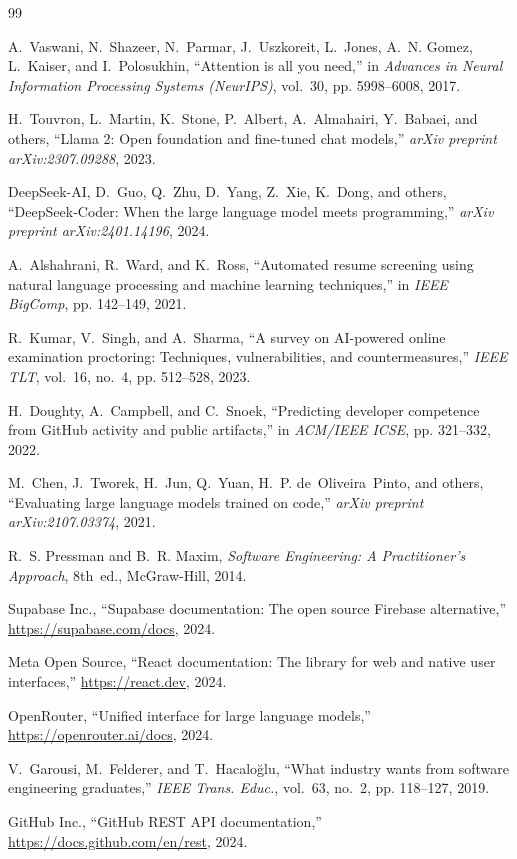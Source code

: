 \documentclass[12pt,a4paper]{report}
\begin{document}
\begin{thebibliography}{99}

A.~Vaswani, N.~Shazeer, N.~Parmar, J.~Uszkoreit, L.~Jones, A.~N. Gomez, L.~Kaiser, and I.~Polosukhin, ``Attention is all you need,'' in \textit{Advances in Neural Information Processing Systems (NeurIPS)}, vol.~30, pp. 5998--6008, 2017.

H.~Touvron, L.~Martin, K.~Stone, P.~Albert, A.~Almahairi, Y.~Babaei, and others, ``Llama 2: Open foundation and fine-tuned chat models,'' \textit{arXiv preprint arXiv:2307.09288}, 2023.

DeepSeek-AI, D.~Guo, Q.~Zhu, D.~Yang, Z.~Xie, K.~Dong, and others, ``DeepSeek-Coder: When the large language model meets programming,'' \textit{arXiv preprint arXiv:2401.14196}, 2024.

A.~Alshahrani, R.~Ward, and K.~Ross, ``Automated resume screening using natural language processing and machine learning techniques,'' in \textit{IEEE BigComp}, pp. 142--149, 2021.

R.~Kumar, V.~Singh, and A.~Sharma, ``A survey on AI-powered online examination proctoring: Techniques, vulnerabilities, and countermeasures,'' \textit{IEEE TLT}, vol.~16, no.~4, pp. 512--528, 2023.

H.~Doughty, A.~Campbell, and C.~Snoek, ``Predicting developer competence from GitHub activity and public artifacts,'' in \textit{ACM/IEEE ICSE}, pp. 321--332, 2022.

M.~Chen, J.~Tworek, H.~Jun, Q.~Yuan, H.~P. de~Oliveira~Pinto, and others, ``Evaluating large language models trained on code,'' \textit{arXiv preprint arXiv:2107.03374}, 2021.

R.~S. Pressman and B.~R. Maxim, \textit{Software Engineering: A Practitioner's Approach}, 8th~ed., McGraw-Hill, 2014.

Supabase Inc., ``Supabase documentation: The open source Firebase alternative,'' \url{https://supabase.com/docs}, 2024.

Meta Open Source, ``React documentation: The library for web and native user interfaces,'' \url{https://react.dev}, 2024.

OpenRouter, ``Unified interface for large language models,'' \url{https://openrouter.ai/docs}, 2024.

V.~Garousi, M.~Felderer, and T.~Hacalo{\u{g}}lu, ``What industry wants from software engineering graduates,'' \textit{IEEE Trans. Educ.}, vol.~63, no.~2, pp. 118--127, 2019.

GitHub Inc., ``GitHub REST API documentation,'' \url{https://docs.github.com/en/rest}, 2024.

\end{thebibliography}
\end{document}
